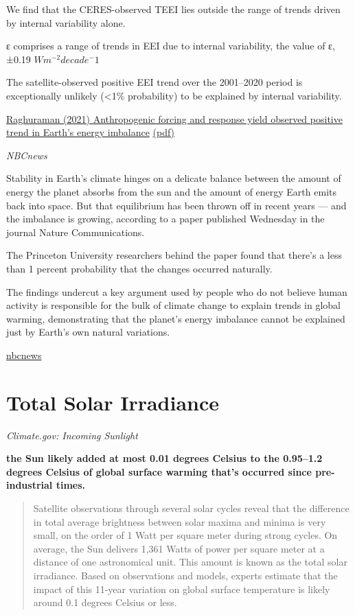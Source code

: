 \documentclass[
]{book}
\begin{document}
We find that the CERES-observed TEEI lies outside the range
of trends driven by internal variability alone.

ε comprises a range of trends in EEI due to internal
variability, the value of ε, ±0.19 \(Wm^{-2} decade^−1\)

The satellite-observed positive EEI trend over the 2001--2020
period is exceptionally unlikely (\textless1\% probability) to be
explained by internal variability.

\href{https://www.nature.com/articles/s41467-021-24544-4}{Raghuraman (2021) Anthropogenic forcing and response yield observed positive trend in Earth's energy imbalance}
\href{pdf/Raghuraman_2021_TEEI.pdf}{(pdf)}

\emph{NBCnews}

Stability in Earth's climate hinges on a delicate balance between the amount of energy the planet absorbs from the sun and the amount of energy Earth emits back into space. But that equilibrium has been thrown off in recent years --- and the imbalance is growing, according to a paper published Wednesday in the journal Nature Communications.

The Princeton University researchers behind the paper found that there's a less than 1 percent probability that the changes occurred naturally.

The findings undercut a key argument used by people who do not believe human activity is responsible for the bulk of climate change to explain trends in global warming, demonstrating that the planet's energy imbalance cannot be explained just by Earth's own natural variations.

\href{https://www.nbcnews.com/science/environment/earths-energy-imbalance-removes-almost-doubt-human-made-climate-change-rcna1562}{nbcnews}

\hypertarget{total-solar-irradiance}{%
\section{Total Solar Irradiance}\label{total-solar-irradiance}}

\emph{Climate.gov: Incoming Sunlight}

\textbf{the Sun likely added at most 0.01 degrees Celsius to the 0.95--1.2 degrees Celsius of global surface warming that's occurred since pre-industrial times.}

\begin{quote}
Satellite observations through several solar cycles reveal that the difference in total average brightness between solar maxima and minima is very small, on the order of 1 Watt per square meter during strong cycles. On average, the Sun delivers 1,361 Watts of power per square meter at a distance of one astronomical unit. This amount is known as the total solar irradiance. Based on observations and models, experts estimate that the impact of this 11-year variation on global surface temperature is likely around 0.1 degrees Celsius or less.
\end{quote}
\end{document}
